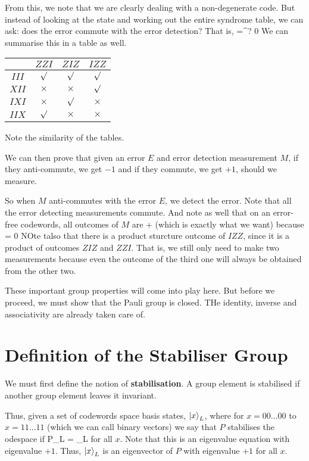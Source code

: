 From this, we note that we are clearly dealing with a non-degenerate code. But instead of looking at the state and working out the entire syndrome table, we can ask: does the error commute with the error detection? That is, 
\beq
[M, E] =^? 0
\eeq
We can summarise this in a table as well. 

\begin{tabular}{c|ccc}
& $ZZI$  & $ZIZ$ & $IZZ$ \\ \hline
$III$ & $\surd$ & $\surd$ & $\surd$ \\
$XII$ & $\times$ & $\times $ & $\surd$ \\
$IXI$ & $\times $ & $\surd$ & $\times$ \\
$IIX$ & $\surd$ & $\times$ & $\times$ 
\end{tabular}
Note the similarity of the tables. 

We can then prove that given an error $E$ and error detection measurement $M$, if they anti-commute, we get $-1$ and if they commute, we get $+1$, should we measure. 

So when $M$ anti-commutes with the error $E$, we detect the error. Note that all the error detecting measurements commute. And note as well that on an error-free codewords, all outcomes of $M$ are + (which is exactly what we want) because
\beq
[M, I] = 0
\eeq
NOte talso that there is a product sturcture outcome of $IZZ$, since it is a product of outcomes $ZIZ$ and $ZZI$. That is, we still only need to make two measurements because even the outcome of the third one will always be obtained from the other two. 

These important group properties will come into play here. But before we proceed, we must show that the Pauli group is closed. THe identity, inverse and associativity are already taken care of. 

\section{Definition of the Stabiliser Group}
We must first define the notion of \textbf{stabilisation}. A group element is stabilised if another group element leaves it invariant. 

Thus, given a set of codewords space basis states, $\ket{x}_L$, where for $x = 00\ldots 00$ to $x = 11 \ldots 11$ (which we can call binary vectors) we say that $P$ stabilises the odespace if
\beq
P_L = _L
\eeq
for all $x$. Note that this is an eigenvalue equation with eigenvalue $+1$. Thus, $\ket{x}_L$ is an eigenvector of $P$ with eigenvalue  $+1$ for all $x$. 

